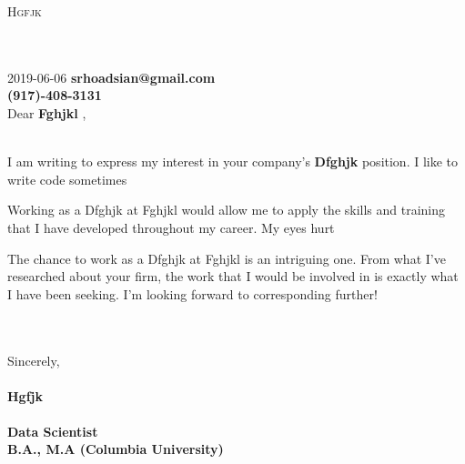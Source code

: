 \documentclass[]{formatting}\usepackage[]{graphicx}\usepackage[]{color}
\begin{document}
\colorbox{mygray}{
\parbox[t]{\linewidth}{
\vspace*{14pt} 
\hfill \color{white} \textsc{\huge 
Hgfjk
 }
\vspace*{14pt} 
}}
\large{\\ \\
2019-06-06
\hfill 
\textbf{
srhoadsian@gmail.com
} \\
}
\large{
\vspace*{14pt}
\hfill \color{white} {\textbf{\large
(917)-408-3131
}}
}
\\
\large{Dear \textbf{
Fghjkl
},}
\\
\\
\large{
I am writing to express my interest in your company's \textbf{
Dfghjk
} position.
I like to write code sometimes
 
    
    Working as a 
Dfghjk
 at
Fghjkl
 would allow me to apply the skills and training that I have developed throughout my career. 
My eyes hurt

    
    


    
    


    
    The chance to work as a 
Dfghjk
 at
Fghjkl
 is an intriguing one. From what I’ve researched about your firm, the work that I would be involved in is exactly what I have been seeking. I'm looking forward to corresponding further!
}
\\
\\
\large{Sincerely,}\\
\\
\large{\textbf{
Hgfjk
}}\\
\\
\small{\textbf{
Data Scientist
}}\\
\small{\textbf{
B.A., M.A (Columbia University)
}}\\
\end{document}
